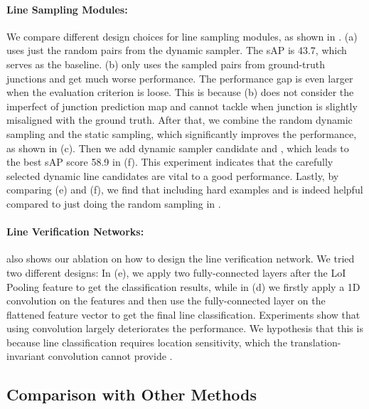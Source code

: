 \documentclass[10pt,twocolumn,letterpaper]{article}
\begin{document}
\paragraph{Line Sampling Modules:} We compare different design choices for line sampling modules, as shown in . (a) uses just the random pairs from the dynamic sampler. The sAP is 43.7, which serves as the baseline. (b) only uses the sampled pairs from ground-truth junctions and get much worse performance.  The performance gap is even larger when the evaluation criterion is loose. This is because (b) does not consider the imperfect of junction prediction map and cannot tackle when junction is slightly misaligned with the ground truth. After that, we combine the random dynamic sampling and the static sampling, which significantly improves the performance, as shown in  (c). Then we add dynamic sampler candidate  and , which leads to the best sAP score 58.9 in (f). This experiment indicates that the carefully selected dynamic line candidates are vital to a good performance.  Lastly, by comparing (e) and (f), we find that including hard examples  and  is indeed helpful compared to just doing the random sampling in .

\paragraph{Line Verification Networks:}  also shows our ablation on how to design the line verification network. We tried two different designs: In  (e), we apply two fully-connected layers after the LoI Pooling feature to get the classification results, while in  (d) we firstly apply a 1D convolution on the features and then use the fully-connected layer on the flattened feature vector to get the final line classification. Experiments show that using convolution largely deteriorates the performance. We hypothesis that this is because line classification requires location sensitivity, which the translation-invariant convolution cannot provide \cite{dai2016r, li2017fully}.

\subsection{Comparison with Other Methods} \label{sec:comparision}
\end{document}
